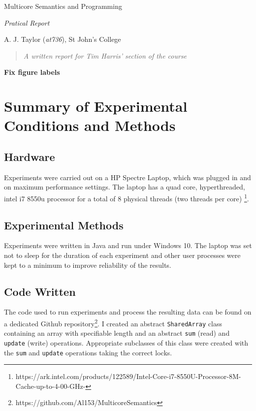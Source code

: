 \documentclass[11pt]{article}
\newcommand{\todo}[1]{\textbf{#1}}
\begin{document}
\centerline{\Large Multicore Semantics and Programming}
\vspace{2em}
\centerline{\Large \emph{Pratical Report}}
\vspace{2em}
\centerline{\large A. J. Taylor (\emph{at736}), St John's College}
\vspace{1em}

\begin{abstract}
\textsl{
	A written report for Tim Harris' section of the course
} 
\end{abstract}


\todo{Fix figure labels}

\section{Summary of Experimental Conditions and Methods}

\subsection{Hardware}
Experiments were carried out on a HP Spectre Laptop, which was plugged in and on maximum performance settings. The laptop has a quad core, hyperthreaded, intel i7 8550u processor for a total of 8 physical threads (two threads per core) \footnote{https://ark.intel.com/products/122589/Intel-Core-i7-8550U-Processor-8M-Cache-up-to-4-00-GHz-}.

\subsection{Experimental Methods}
Experiments were written in Java and run under Windows 10. The laptop was set not to sleep for the duration of each experiment and other user processes were kept to a minimum to improve reliability of the results.

\subsection{Code Written}
The code used to run experiments and process the resulting data can be found on a dedicated Github repository\footnote{https://github.com/Al153/MulticoreSemantics}. I created an abstract \texttt{SharedArray} class containing an array with specifiable length and an abstract \texttt{sum} (read) and \texttt{update} (write) operations. Appropriate subclasses of this class were created with the \texttt{sum} and \texttt{update} operations taking the correct locks.
\end{document}
